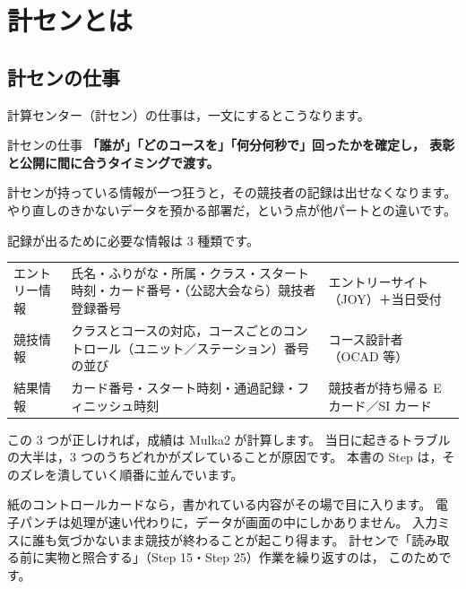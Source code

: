 \chapter{計センとは}

\section{計センの仕事}

計算センター（計セン）の仕事は，一文にするとこうなります。

\begin{Key}{計センの仕事}
\textbf{「誰が」「どのコースを」「何分何秒で」回ったかを確定し，
表彰と公開に間に合うタイミングで渡す。}
\end{Key}

計センが持っている情報が一つ狂うと，その競技者の記録は出せなくなります。
やり直しのきかないデータを預かる部署だ，という点が他パートとの違いです。

記録が出るために必要な情報は 3 種類です。

\vspace{3pt}
\begin{center}
\begin{tabular}{@{}P{30mm}P{60mm}P{62mm}@{}}
\toprule
{} &  &  \\
\midrule
エントリー情報 & 氏名・ふりがな・所属・クラス・スタート時刻・カード番号・（公認大会なら）競技者登録番号
  & エントリーサイト（JOY）＋当日受付 \\
競技情報 & クラスとコースの対応，コースごとのコントロール（ユニット／ステーション）番号の並び
  & コース設計者（OCAD 等） \\
結果情報 & カード番号・スタート時刻・通過記録・フィニッシュ時刻
  & 競技者が持ち帰る E カード／SI カード \\
\bottomrule
\end{tabular}
\end{center}
\vspace{3pt}

この 3 つが正しければ，成績は Mulka2 が計算します。
当日に起きるトラブルの大半は，3 つのうちどれかがズレていることが原因です。
本書の Step は，そのズレを潰していく順番に並んでいます。

\begin{Note}
紙のコントロールカードなら，書かれている内容がその場で目に入ります。
電子パンチは処理が速い代わりに，データが画面の中にしかありません。
入力ミスに誰も気づかないまま競技が終わることが起こり得ます。
計センで「読み取る前に実物と照合する」（Step 15・Step 25）作業を繰り返すのは，
このためです。
\end{Note}

